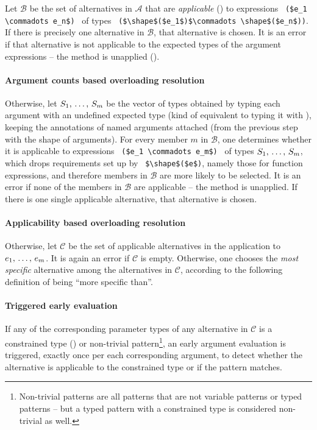 Let $\mathcal{B}$ be the set of alternatives in $\mathcal{A}$ that are {\em applicable} () to expressions ~\lstinline!($e_1 \commadots e_n$)!~ of types ~\lstinline!($\shape$($e_1$)$\commadots \shape$($e_n$))!. If there is precisely one alternative in $\mathcal{B}$, that alternative is chosen. It is an error if that alternative is not applicable to the expected types of the argument expressions -- the method is unapplied (). 

\paragraph{Argument counts based overloading resolution}
Otherwise, let $S_1 ,\, \ldots ,\, S_m$ be the vector of types obtained by typing each argument with an undefined expected type (kind of equivalent to typing it with ), keeping the annotations of named arguments attached (from the previous step with the shape of arguments). For every member $m$ in $\mathcal{B}$, one determines whether it is applicable to expressions ~\lstinline!($e_1 \commadots e_m$)!~ of types $S_1 ,\, \ldots ,\, S_m$, which drops requirements set up by ~\lstinline!$\shape$($e$)!, namely those for function expressions, and therefore members in $\mathcal{B}$ are more likely to be selected. It is an error if none of the members in $\mathcal{B}$ are applicable -- the method is unapplied. If there is one single applicable alternative, that alternative is chosen. 

\paragraph{Applicability based overloading resolution}
Otherwise, let $\mathcal{C}$ be the set of applicable alternatives in the application to $e_1 ,\, \ldots ,\, e_m$. It is again an error if $\mathcal{C}$ is empty. Otherwise, one chooses the {\em most specific} alternative among the alternatives in $\mathcal{C}$, according to the following definition of being  ``more specific than''.

\paragraph{Triggered early evaluation}
If any of the corresponding parameter types of any alternative in $\mathcal{C}$ is a constrained type () or non-trivial pattern\footnote{Non-trivial patterns are all patterns that are not variable patterns or typed patterns -- but a typed pattern with a constrained type is considered non-trivial as well.}, an early argument evaluation is triggered, exactly once per each corresponding argument, to detect whether the alternative is applicable to the constrained type or if the pattern matches. 

